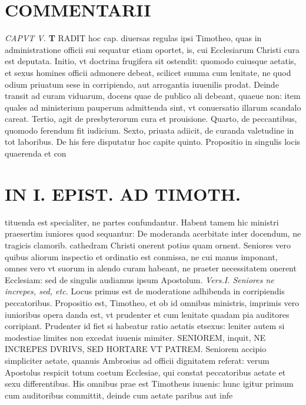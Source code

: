 \documentclass{article}
\begin{document}
\begin{pages}
\section*{COMMENTARII }
\marginpar{[ p.116 ]}
\textit{CAPVT V. }
\textbf{T }\pstart RADIT hoc cap. diuersas regulas ipsi Timotheo, quas in administratione officii sui sequatur etiam oportet, is, cui Ecclesiarum Christi cura est deputata. Initio, vt doctrina frugifera sit ostendit: quomodo cuiusque aetatis, et sexus homines officii admonere debeat, scilicet summa cum lenitate, ne quod odium priuatum sese in corripiendo, aut arrogantia iuuenilis prodat.  \pend\pstart Deinde transit ad curam viduarum, docens quae de publico ali debeant, quaeue non: item quales ad ministerium pauperum admittenda sint, vt conuersatio illarum scandalo careat.  \pend\pstart Tertio, agit de presbyterorum cura et prouisione.  \pend\pstart Quarto, de peccantibus, quomodo ferendum fit iudicium.  \pend\pstart Sexto, priuata adiicit, de curanda valetudine in tot laboribus. De his fere disputatur hoc capite quinto.  \pend\pstart Propositio in singulis locis quaerenda et con  \pend
\section*{IN I. EPIST. AD TIMOTH. }
\marginpar{[ p.117 ]}\pstart tituenda est specialiter, ne partes confundantur. Habent tamem hic ministri praesertim iuniores quod sequantur: De moderanda acerbitate inter docendum, ne tragicis clamorib. cathedram Christi onerent potius quam ornent. Seniores vero quibus aliorum inspectio et ordinatio est conmissa, ne cui manus imponant, omnes vero vt suorum in alendo curam habeant, ne praeter necessitatem onerent Ecclesiam: sed de singulis audiamus ipsum Apostolum.  \pend
\textit{Vers.I. Seniores ne increpes, sed, etc. }\pstart Locus primus est de moderatione adhibenda in corripiendis peccatoribus. Propositio est, Timotheo, et ob id omnibus ministris, imprimis vero iunioribus opera danda est, vt prudenter et cum lenitate quadam pia auditores corripiant. Prudenter id fiet si habeatur ratio aetatis etsexus: leniter autem si modestiae limites non excedat iuuenis mimiter.  \pend\pstart SENIOREM, inquit, NE INCREPES DVRIVS, SED HORTARE VT PATREM. Seniorem accipio simpliciter aetate, quanuis Ambrosius ad officii dignitatem referat: verum Apostolus respicit totum coetum Ecclesiae, qui constat peccatoribus aetate et sexu differentibus. His omnibus prae est Timotheus iuuenis: hunc igitur primum cum auditoribus committit, deinde cum aetate paribus aut infe\pend

\end{pages}
\end{document}
